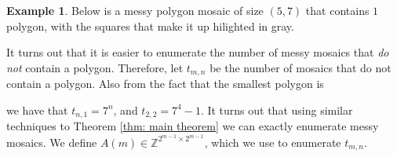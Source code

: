 \documentclass[12pt]{article}
\theoremstyle{plain}
\theoremstyle{definition}
\theoremstyle{remark}
\theoremstyle{definition}
\newtheorem{exmp}{Example}[section]
\newcommand{\cell}[4]{ \draw[thick] ( #1 , #2 ) rectangle ( #3 , #4 );}
\newcommand{\cellA}[4]{ \draw[thick] ( #1 , #2 ) rectangle ( #3 , #4 ); \draw[red, thick, densely dotted] (#3 * 0.5 + #1 * 0.5 , #2) -- (#3, #4 * 0.5 + #2 * 0.5);}
\newcommand{\cellB}[4]{ \draw[thick] ( #1 , #2 ) rectangle ( #3 , #4 ); \draw[red, thick, densely dotted] (#3 * 0.5 + #1 * 0.5 , #2) -- (#1, #4 * 0.5 + #2 * 0.5);}
\newcommand{\cellC}[4]{ \draw[thick] ( #1 , #2 ) rectangle ( #3 , #4 ); \draw[red, thick, densely dotted] (#3 * 0.5 + #1 * 0.5 , #4) -- (#1, #4 * 0.5 + #2 * 0.5);}
\newcommand{\cellD}[4]{ \draw[thick] ( #1 , #2 ) rectangle ( #3 , #4 ); \draw[red, thick, densely dotted] (#3 * 0.5 + #1 * 0.5 , #4) -- (#3, #4 * 0.5 + #2 * 0.5);}
\newcommand{\cellE}[4]{ \draw[thick] ( #1 , #2 ) rectangle ( #3 , #4 ); \draw[red, thick, densely dotted] (#3 * 0.5 + #1 * 0.5 , #2) -- (#3 * 0.5 + #1 * 0.5 , #4);}
\newcommand{\cellF}[4]{ \draw[thick] ( #1 , #2 ) rectangle ( #3 , #4 ); \draw[red, thick, densely dotted] (#3, #4 * 0.5 + #2 * 0.5) -- (#1, #4 * 0.5 + #2 * 0.5);}
\newcommand{\cellAf}[4]{\filldraw[gray!40] ( #1 , #2 ) rectangle ( #3 , #4 ); \draw[thick] ( #1 , #2 ) rectangle ( #3 , #4 ); \draw[red, thick, densely dotted] (#3 * 0.5 + #1 * 0.5 , #2) -- (#3, #4 * 0.5 + #2 * 0.5);}
\newcommand{\cellBf}[4]{\filldraw[gray!40] ( #1 , #2 ) rectangle ( #3 , #4 ); \draw[thick] ( #1 , #2 ) rectangle ( #3 , #4 ); \draw[red, thick, densely dotted] (#3 * 0.5 + #1 * 0.5 , #2) -- (#1, #4 * 0.5 + #2 * 0.5);}
\newcommand{\cellCf}[4]{\filldraw[gray!40] ( #1 , #2 ) rectangle ( #3 , #4 ); \draw[thick] ( #1 , #2 ) rectangle ( #3 , #4 ); \draw[red, thick, densely dotted] (#3 * 0.5 + #1 * 0.5 , #4) -- (#1, #4 * 0.5 + #2 * 0.5);}
\newcommand{\cellDf}[4]{\filldraw[gray!40] ( #1 , #2 ) rectangle ( #3 , #4 ); \draw[thick] ( #1 , #2 ) rectangle ( #3 , #4 ); \draw[red, thick, densely dotted] (#3 * 0.5 + #1 * 0.5 , #4) -- (#3, #4 * 0.5 + #2 * 0.5);}
\newcommand{\cellEf}[4]{\filldraw[gray!40] ( #1 , #2 ) rectangle ( #3 , #4 ); \draw[thick] ( #1 , #2 ) rectangle ( #3 , #4 ); \draw[red, thick, densely dotted] (#3 * 0.5 + #1 * 0.5 , #2) -- (#3 * 0.5 + #1 * 0.5 , #4);}
\newcommand{\cellFf}[4]{\filldraw[gray!40] ( #1 , #2 ) rectangle ( #3 , #4 ); \draw[thick] ( #1 , #2 ) rectangle ( #3 , #4 ); \draw[red, thick, densely dotted] (#3, #4 * 0.5 + #2 * 0.5) -- (#1, #4 * 0.5 + #2 * 0.5);}
\begin{document}
\begin{exmp}
\label{exmp: messy sap}
Below is a messy polygon mosaic of size $(5,7)$ that contains $1$ polygon, with the squares that make it up hilighted in gray. 

\begin{center}
\end{center}
\end{exmp}

It turns out that it is easier to enumerate the number of messy mosaics that \textit{do not} contain a polygon. Therefore, let $t_{m,n}$ be the number of mosaics that do not contain a polygon. Also from the fact that the smallest polygon is

\begin{center}
\end{center}

we have that $t_{n,1}=7^n$, and $t_{2,2} = 7^4 - 1$. It turns out that using similar techniques to Theorem \ref{thm: main theorem} we can exactly enumerate messy mosaics. We define $A(m) \in \mathbb{Z}^{2^{m-1} \times 2^{m-1}}$, which we use to enumerate $t_{m,n}$.
\end{document}
